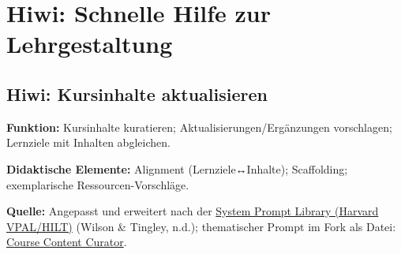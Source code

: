 \documentclass[
  ngerman,
  letterpaper,
  DIV=11]{scrreprt}
\begin{document}
\section{Hiwi: Schnelle Hilfe zur
Lehrgestaltung}\label{hiwi-schnelle-hilfe-zur-lehrgestaltung}

\subsection{Hiwi: Kursinhalte
aktualisieren}\label{sec-prompt-update-kursinhalte}

\textbf{Funktion:} Kursinhalte kuratieren; Aktualisierungen/Ergänzungen
vorschlagen; Lernziele mit Inhalten abgleichen.

\textbf{Didaktische Elemente:} Alignment (Lernziele↔Inhalte);
Scaffolding; exemplarische Ressourcen-Vorschläge.

\textbf{Quelle:} Angepasst und erweitert nach der
\href{https://github.com/ncwilson78/System-Prompt-Library}{System Prompt
Library (Harvard VPAL/HILT)} (Wilson \& Tingley, n.d.); thematischer
Prompt im Fork als Datei:
\href{https://github.com/motazsaad/Harvard-System-Prompt-Library/blob/main/Prompts/Teaching\%20Activities/Course\%20Content\%20Curator\%20GPT.md}{Course
Content Curator}.
\end{document}
